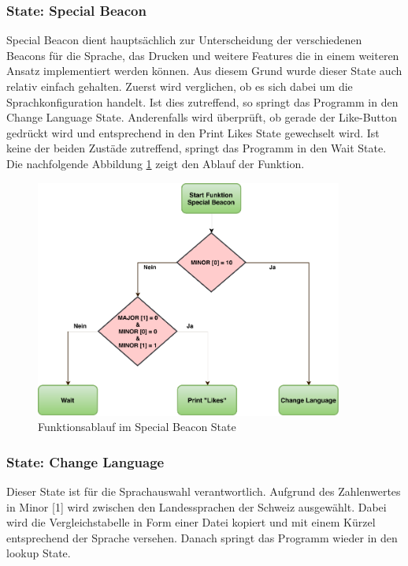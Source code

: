 \subsubsection*{State: Special Beacon}
Special Beacon dient hauptsächlich zur Unterscheidung der verschiedenen Beacons für die Sprache, das Drucken und weitere Features die in einem weiteren Ansatz implementiert werden können. Aus diesem Grund wurde dieser State auch relativ einfach gehalten. Zuerst wird verglichen, ob es sich dabei um die Sprachkonfiguration handelt. Ist dies zutreffend, so springt das Programm in den Change Language State. Anderenfalls wird überprüft, ob gerade der Like-Button gedrückt wird und entsprechend in den Print \glqq Likes \grqq State gewechselt wird. Ist keine der beiden Zustäde zutreffend, springt das Programm in den Wait State. Die nachfolgende Abbildung \ref{fig:specialBeaconState} zeigt den Ablauf der Funktion.

\begin{figure}[htbp!!!!]
	\centering
	\includegraphics[width=0.9\textwidth]{Data/SpecialBeacon_picture.pdf}
	\caption[Statemachine: Special Beacon]{Funktionsablauf im Special Beacon State}
	\label{fig:specialBeaconState}
\end{figure} 
\newpage
\subsubsection*{State: Change Language}

Dieser State ist für die Sprachauswahl verantwortlich. Aufgrund des Zahlenwertes in Minor [1] wird zwischen den Landessprachen der Schweiz ausgewählt. Dabei wird die Vergleichstabelle in Form einer Datei kopiert und mit einem Kürzel entsprechend der Sprache versehen. Danach springt das Programm wieder in den lookup State.

